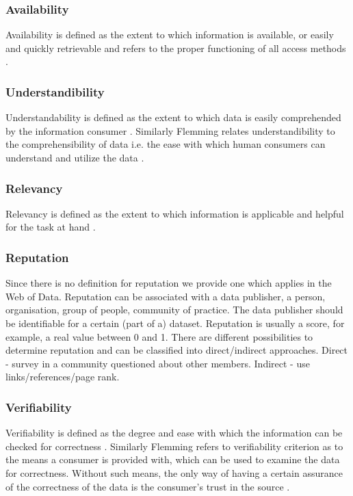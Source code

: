 \subsubsection{Availability}
Availability is defined as the extent to which information is available, or easily and quickly retrievable  \cite{Bizerthesis} and refers to the proper functioning of all access methods \cite{Flemming}. 

\subsubsection{Understandibility}
Understandability is defined as the extent to which data is easily comprehended by the information consumer \cite{Bizerthesis}. Similarly Flemming relates understandibility to the comprehensibility of data i.e. the ease with which human consumers can understand and utilize the data \cite{Flemming}.

\subsubsection{Relevancy}
Relevancy is defined as the extent to which information is applicable and helpful for the task at hand  \cite{Bizerthesis}. 

\subsubsection{Reputation}
Since there is no definition for reputation we provide one which applies in the Web of Data. Reputation can be associated with a data publisher, a person, organisation, group of people, community of practice.
The data publisher should be identifiable for a certain (part of a) dataset. Reputation is usually a score, for example, a real value between 0 and 1. There are different possibilities to determine reputation and can be classified into direct/indirect approaches. Direct - survey in a community questioned about other members.
Indirect - use links/references/page rank.
\subsubsection{Verifiability}
Verifiability is defined as the degree and ease with which the information can be checked for correctness  \cite{Bizerthesis}. Similarly Flemming refers to verifiability criterion as to the means a consumer is provided with, which can be used to examine the data for correctness. Without such means, the only way of having a certain assurance of the correctness of the data is the consumer's trust in the source  \cite{Flemming}. 

